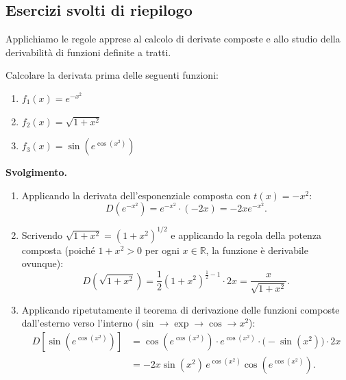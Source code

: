 \subsection{Esercizi svolti di riepilogo}

Applichiamo le regole apprese al calcolo di derivate composte e allo studio della derivabilità di funzioni definite a tratti.

\begin{esbox}
Calcolare la derivata prima delle seguenti funzioni:
\begin{enumerate}
    \item $f_1(x) = e^{-x^2}$
    \item $f_2(x) = \sqrt{1 + x^2}$
    \item $f_3(x) = \sin\!\left(e^{\cos(x^2)}\right)$
\end{enumerate}

\medskip
\noindent\textbf{Svolgimento.}
\begin{enumerate}
    \item Applicando la derivata dell'esponenziale composta con $t(x) = -x^2$:
    \[
        D\!\left(e^{-x^2}\right) = e^{-x^2} \cdot (-2x) = -2x e^{-x^2}.
    \]

    \item Scrivendo $\sqrt{1 + x^2} = (1 + x^2)^{1/2}$ e applicando la regola della potenza composta (poiché $1 + x^2 > 0$ per ogni $x \in \mathbb{R}$, la funzione è derivabile ovunque):
    \[
        D\!\left(\sqrt{1 + x^2}\right) = \frac{1}{2}(1 + x^2)^{\frac{1}{2} - 1} \cdot 2x = \frac{x}{\sqrt{1 + x^2}}.
    \]

    \item Applicando ripetutamente il teorema di derivazione delle funzioni composte dall'esterno verso l'interno ($\sin \to \exp \to \cos \to x^2$):
    \begin{align*}
        D\!\left[\sin\!\left(e^{\cos(x^2)}\right)\right] &= \cos\!\left(e^{\cos(x^2)}\right) \cdot e^{\cos(x^2)} \cdot \bigl(-\sin(x^2)\bigr) \cdot 2x \\
        &= -2x \sin(x^2)\, e^{\cos(x^2)} \cos\!\left(e^{\cos(x^2)}\right).
    \end{align*}
\end{enumerate}
\end{esbox}

